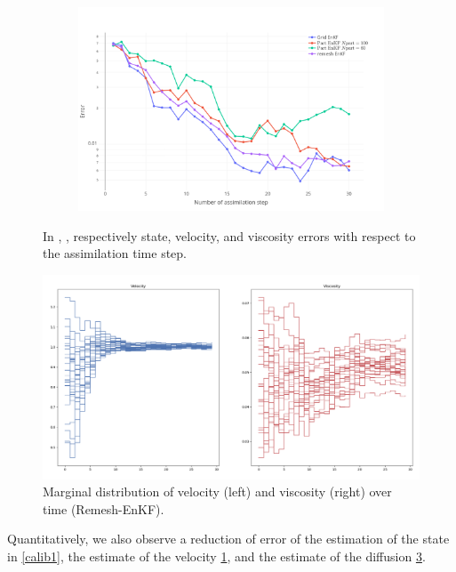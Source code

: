 \begin{figure}[ht]
\begin{subfigure}{0.49\textwidth}
		\caption{}
		\label{calib2}
	\end{subfigure}
	\vfill
	\begin{subfigure}{0.49\textwidth}
		\includegraphics[width=\textwidth]{images/app1d/w_calibration/viscosity_error.png}
		\caption{}
		\label{calib3}
	\end{subfigure}
	\caption{In , ,  respectively state, velocity, and viscosity errors with respect to the assimilation time step.}
\end{figure}

\begin{figure}[ht]
	\includegraphics[width=\textwidth]{images/app1d/w_calibration/remesh EnKF_params.png}
	\caption{Marginal distribution of velocity (left) and viscosity (right) over time (Remesh-EnKF).}
	\label{calib4}
\end{figure}

Quantitatively, we also observe a reduction of error of the estimation of the state in \ref{calib1}, the estimate of the velocity \ref{calib2}, and the estimate of the diffusion \ref{calib3}.

